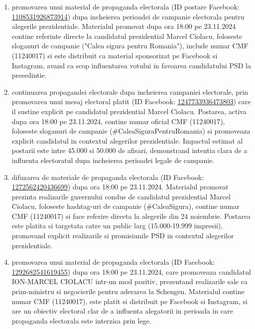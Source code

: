\documentclass[a4paper,12pt]{article}
\begin{document}
\begin{enumerate}[leftmargin=*, label=\arabic*.)]
    \item promovarea unui material de propaganda electorala (ID postare Facebook: \href{https://www.facebook.com/ads/library/?id=1108531926873914}{1108531926873914}) dupa incheierea perioadei de campanie electorala pentru alegerile prezidentiale. Materialul promovat dupa ora 18:00 pe 23.11.2024 contine referinte directe la candidatul prezidential Marcel Ciolacu, foloseste sloganuri de campanie ("Calea sigura pentru Romania"), include numar CMF (11240017) si este distribuit ca material sponsorizat pe Facebook si Instagram, avand ca scop influentarea votului in favoarea candidatului PSD la presedintie.
    \item continuarea propagandei electorale dupa incheierea campaniei electorale, prin promovarea unui mesaj electoral platit (ID Facebook: \href{https://www.facebook.com/ads/library/?id=1247733936473803}{1247733936473803}) care il sustine explicit pe candidatul prezidential Marcel Ciolacu. Postarea, activa dupa ora 18:00 pe 23.11.2024, contine numar oficial CMF (11240017), foloseste sloganuri de campanie (\#CaleaSiguraPentruRomania) si promoveaza explicit candidatul in contextul alegerilor prezidentiale. Impactul estimat al postarii este intre 45.000 si 50.000 de afisari, demonstrand intentia clara de a influenta electoratul dupa incheierea perioadei legale de campanie.
    \item difuzarea de materiale de propaganda electorala (ID Facebook: \href{https://www.facebook.com/ads/library/?id=1272562420436699}{1272562420436699}) dupa ora 18:00 pe 23.11.2024. Materialul promovat prezinta realizarile guvernului condus de candidatul prezidential Marcel Ciolacu, foloseste hashtag-uri de campanie (\#CaleaSigura), contine numar CMF (11240017) si face referire directa la alegerile din 24 noiembrie. Postarea este platita si targetata catre un public larg (15.000-19.999 impresii), promovand explicit realizarile si promisiunile PSD in contextul alegerilor prezidentiale.
    \item promovarea unui material de propaganda electorala (ID Facebook: \href{https://www.facebook.com/ads/library/?id=1292682541619455}{1292682541619455}) dupa ora 18:00 pe 23.11.2024, care promoveaza candidatul ION-MARCEL CIOLACU intr-un mod pozitiv, prezentand realizarile sale ca prim-ministru si negocierile pentru aderarea la Schengen. Materialul contine numar CMF (11240017), este platit si distribuit pe Facebook si Instagram, si are un obiectiv electoral clar de a influenta alegatorii in perioada in care propaganda electorala este interzisa prin lege.

\end{enumerate}
\end{document}
